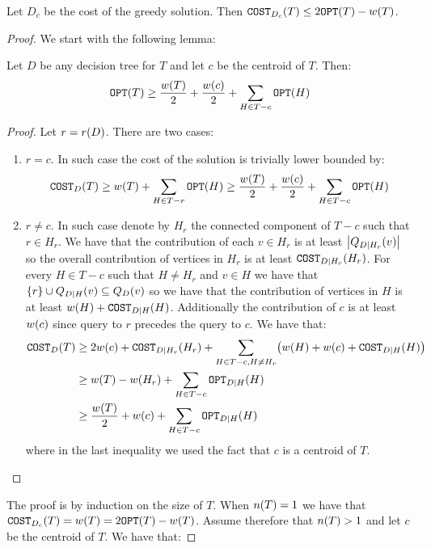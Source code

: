 \begin{theorem}
    Let $D_c$ be the cost of the greedy solution. Then $\texttt{COST}_{D_c}\mathopen{}\left( T \right)\leq 2\texttt{OPT}\mathopen{}\left( T \right)-w\mathopen{}\left( T \right)$.
    \begin{proof}
        We start with the following lemma:
        \begin{lemma}\label{lemma:avg_lb_centroid}
            Let $D$ be any decision tree for $T$ and let $c$ be the centroid of $T$. Then:
            $$
            \texttt{OPT}\mathopen{}\left( T \right)\geq \frac{w\mathopen{}\left( T \right)}{2}+\frac{w\mathopen{}\left( c \right)}{2}+\sum_{H\in T-c}\texttt{OPT}\mathopen{}\left( H \right)
            $$
            \begin{proof}
                Let $r=r\mathopen{}\left( D \right)$. There are two cases:
                \begin{enumerate}
                    \item $r=c$. In such case the cost of the solution is trivially lower bounded by:
                    $$
                    \texttt{COST}_{D}\mathopen{}\left( T \right)\geq w\mathopen{}\left( T \right)+\sum_{H\in T-r}\texttt{OPT}\mathopen{}\left( H \right)\geq \frac{w\mathopen{}\left( T \right)}{2}+\frac{w\mathopen{}\left( c \right)}{2}+\sum_{H\in T-c}\texttt{OPT}\mathopen{}\left( H \right)
                    $$
                    \item $r\neq c$. In such case denote by $H_r$ the connected component of $T-c$ such that $r\in H_r$. We have that the contribution of each $v\in H_r$ is at least $\mathopen{}\left| Q_{D|H_r}\mathopen{}\left( v \right) \right|$ so the overall contribution of vertices in $H_r$ is at least $\texttt{COST}_{D|H_r}\mathopen{}\left( H_r \right)$. For every $H\in T-c$ such that $H\neq H_r$ and $v\in H$ we have that $\mathopen{}\left\{ r \right\}\cup Q_{D|H}\mathopen{}\left( v \right)\subseteq Q_{D}\mathopen{}\left( v \right)$ so we have that the contribution of vertices in $H$ is at least $w\mathopen{}\left( H \right)+\texttt{COST}_{D|H}\mathopen{}\left( H \right)$. Additionally the contribution of $c$ is at least $w\mathopen{}\left( c \right)$ since query to $r$ precedes the query to $c$. We have that:
                    \begin{align*}
                        \texttt{COST}_D\mathopen{}\left( T \right)&\geq 2w\mathopen{}\left( c \right)+\texttt{COST}_{D|H_r}\mathopen{}\left( H_r \right)+\sum_{H\in T-c, H\neq H_r}\mathopen{}\left( w\mathopen{}\left( H \right)+w\mathopen{}\left( c \right)+\texttt{COST}_{D|H}\mathopen{}\left( H \right) \right)\\
                        &\geq w\mathopen{}\left( T \right)-w\mathopen{}\left( H_r \right)+\sum_{H\in T-c}\texttt{OPT}_{D|H}\mathopen{}\left( H \right)\\
                        &\geq \frac{w\mathopen{}\left( T \right)}{2}+w\mathopen{}\left( c \right)+\sum_{H\in T-c}\texttt{OPT}_{D|H}\mathopen{}\left( H \right)
                    \end{align*}
                    where in the last inequality we used the fact that $c$ is a centroid of $T$.
                \end{enumerate}
            \end{proof}
        \end{lemma}
        The proof is by induction on the size of $T$. When $n\mathopen{}\left( T \right)=1$ we have that $\texttt{COST}_{D_c}\mathopen{}\left( T \right)=w\mathopen{}\left( T \right)=2\texttt{OPT}\mathopen{}\left( T \right)-w\mathopen{}\left( T \right)$. Assume therefore that $n\mathopen{}\left( T \right)>1$ and let $c$ be the centroid of $T$. We have that:

\end{proof}
\end{theorem}

